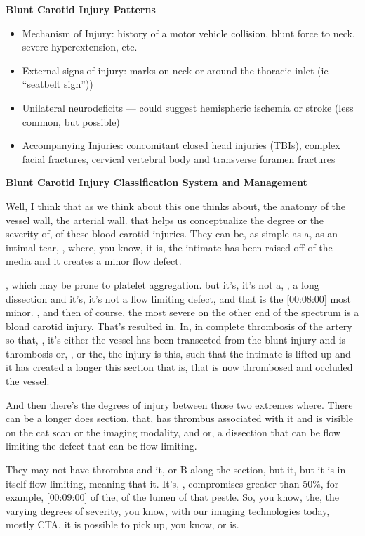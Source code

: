 \documentclass[
]{book}
\providecommand{\tightlist}{%
  \setlength{\itemsep}{0pt}\setlength{\parskip}{0pt}}
\begin{document}
\textbf{Blunt Carotid Injury Patterns}

\begin{itemize}
\tightlist
\item
  Mechanism of Injury: history of a motor vehicle collision, blunt force to neck, severe hyperextension, etc.
\item
  External signs of injury: marks on neck or around the thoracic inlet (ie ``seatbelt sign''))
\item
  Unilateral neurodeficits --- could suggest hemispheric ischemia or stroke (less common, but possible)
\item
  Accompanying Injuries: concomitant closed head injuries (TBIs), complex facial fractures, cervical vertebral body and transverse foramen fractures
\end{itemize}

\textbf{Blunt Carotid Injury Classification System and Management}

Well, I think
that as we think about this one thinks about, the anatomy of the vessel
wall, the arterial wall. that helps us conceptualize the degree or the
severity of, of these blood carotid injuries. They can be, as simple
as a, as an intimal tear, , where, you know, it is, the intimate has
been raised off of the media and it creates a minor flow defect.

, which may be prone to platelet aggregation. but it's, it's not a,
, a long dissection and it's, it's not a flow limiting defect, and that
is the {[}00:08:00{]} most minor. , and then of course, the most severe on
the other end of the spectrum is a blond carotid injury. That's resulted
in. In, in complete thrombosis of the artery so that, , it's either the
vessel has been transected from the blunt injury and is thrombosis or, ,
or the, the injury is this, such that the intimate is lifted up and it
has created a longer this section that is, that is now thrombosed and
occluded the vessel.

And then there's the degrees of injury between those two extremes where.
There can be a longer does section, that, has thrombus associated
with it and is visible on the cat scan or the imaging modality, and
or, a dissection that can be flow limiting the defect that can be
flow limiting.

They may not have thrombus and it, or B along the section, but it, but
it is in itself flow limiting, meaning that it. It's, , compromises
greater than 50\%, for example, {[}00:09:00{]} of the, of the lumen of that
pestle. So, you know, the, the varying degrees of severity, you
know, with our imaging technologies today, mostly CTA, it is possible to
pick up, you know, or is.
\end{document}

